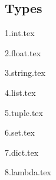 
\subsection{Types}
{
	\lipsum[1]
	
	{1.int.tex}
	
	{2.float.tex}
	
	{3.string.tex}
	
	{4.list.tex}
	
	{5.tuple.tex}
	
	{6.set.tex}
	
	{7.dict.tex}
	
	{8.lambda.tex}
}


